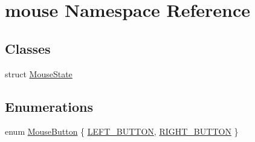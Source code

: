 \hypertarget{namespacemouse}{\section{mouse Namespace Reference}
\label{namespacemouse}
}
\subsection*{Classes}
\begin{DoxyCompactItemize}
\item 
struct \hyperlink{structmouse_1_1_mouse_state}{Mouse\-State}
\end{DoxyCompactItemize}
\subsection*{Enumerations}
\begin{DoxyCompactItemize}
\item 
enum \hyperlink{namespacemouse_a185e90053251dae588490005b1953fee}{Mouse\-Button} \{ \hyperlink{namespacemouse_a185e90053251dae588490005b1953feead099c4586c3d6cf30e4d4da38bc414ca}{L\-E\-F\-T\-\_\-\-B\-U\-T\-T\-O\-N}, 
\hyperlink{namespacemouse_a185e90053251dae588490005b1953feea9ab944e0c7a1999da316be044705f024}{R\-I\-G\-H\-T\-\_\-\-B\-U\-T\-T\-O\-N}
 \}
\end{DoxyCompactItemize}
